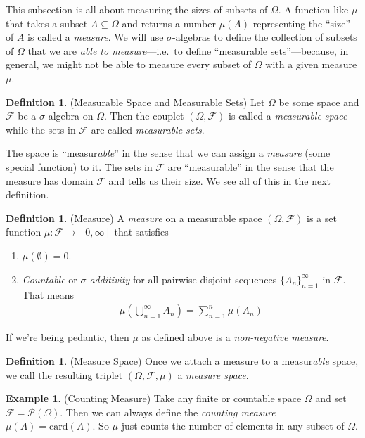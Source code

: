 \documentclass[12pt]{article}
\theoremstyle{plain}
\theoremstyle{definition}
\newtheorem{defn}[thm]{Definition}
\newtheorem{ex}[thm]{Example}
\theoremstyle{remark}
\newcommand{\sF}{\mathscr{F}}
\begin{document}
This subsection is all about measuring the sizes of subsets of $\Omega$.
A function like $\mu$ that takes a subset $A\subseteq\Omega$ and returns
a number $\mu(A)$ representing the ``size'' of $A$ is called a
\emph{measure}.
We will use $\sigma$-algebras to define the collection
of subsets of $\Omega$ that we are \emph{able to measure}---i.e.\ to
define ``measurable sets''---because, in general, we might not be able
to measure every subset of $\Omega$ with a given measure $\mu$.


\begin{defn}(Measurable Space and Measurable Sets)
Let $\Omega$ be some space and $\sF$ be a $\sigma$-algebra on
$\Omega$. Then the couplet $(\Omega, \sF)$ is called a
\emph{measurable space} while the sets in $\sF$ are called
\emph{measurable sets}.

The space is ``measur\emph{able}'' in the sense that we can assign a
\emph{measure} (some special function) to it. The sets in $\sF$ are
``measurable'' in the sense that the measure has domain $\sF$ and tells
us their size. We see all of this in the next definition.
\end{defn}

\begin{defn}(Measure)
\label{defn:measure}
A \emph{measure} on a measurable space $(\Omega,\sF)$ is a set function
$\mu: \sF \rightarrow [0,\infty]$ that satisfies
\begin{enumerate}
  \item $\mu(\emptyset)=0$.
  \item \emph{Countable} or \emph{$\sigma$-additivity} for all pairwise
    disjoint sequences $\{A_n\}_{n=1}^\infty$ in $\sF$. That means
    \begin{align*}
      \mu\left(\bigcup^\infty_{n=1}A_n\right)
      = \sum^n_{n=1} \mu(A_n)
    \end{align*}
\end{enumerate}
If we're being pedantic, then $\mu$ as defined above is a
\emph{non-negative measure}.
\end{defn}

\begin{defn}(Measure Space)
Once we attach a measure to a measur\emph{able} space, we call the
resulting triplet $(\Omega,\sF,\mu)$ a \emph{measure space}.
\end{defn}

\begin{ex}(Counting Measure)
Take any finite or countable space $\Omega$ and set
$\sF=\mathscr{P}(\Omega)$. Then we can always define the
\emph{counting measure} $\mu(A) = \text{card}(A)$.  So $\mu$ just counts
the number of elements in any subset of $\Omega$.
\end{ex}
\end{document}
